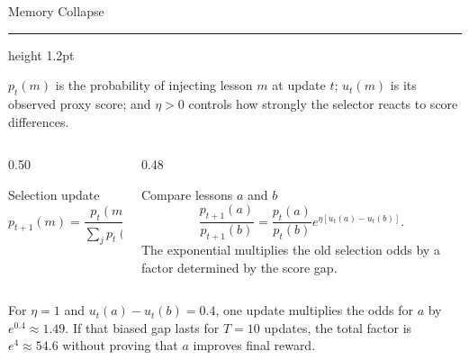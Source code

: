 \documentclass[aspectratio=169]{beamer}
\newcommand{\titlerule}{{\color{titledred}\hrule height 1.2pt}}
\begin{document}
\begin{frame}{Memory Collapse}
\vspace{-0.35em}
\titlerule
\vspace{0.2em}

\begin{block}{}
$p_t(m)$ is the probability of injecting lesson $m$ at update $t$;
$u_t(m)$ is its observed proxy score; and $\eta>0$ controls how strongly the
selector reacts to score differences.
\end{block}

\begin{columns}[T,onlytextwidth]
\begin{column}{0.50\textwidth}
\begin{block}{Selection update}
\[
p_{t+1}(m)=
\frac{p_t(m)e^{\eta u_t(m)}}
{\sum_j p_t(j)e^{\eta u_t(j)}}.
\]
\end{block}
\end{column}

\begin{column}{0.48\textwidth}
\begin{block}{Compare lessons $a$ and $b$}
\[
\frac{p_{t+1}(a)}{p_{t+1}(b)}
\!=\!\frac{p_t(a)}{p_t(b)}
e^{\eta[u_t(a)-u_t(b)]}.
\]
The exponential multiplies the old selection odds by a factor determined by
the score gap.
\end{block}
\end{column}
\end{columns}

\begin{block}{}
For $\eta=1$ and $u_t(a)-u_t(b)=0.4$, one update multiplies the odds for $a$ by
$e^{0.4}\approx1.49$. If that biased gap lasts for $T=10$ updates, the total
factor is $e^{4}\approx54.6$ without proving that $a$ improves final reward.
\end{block}
\end{frame}
\end{document}
